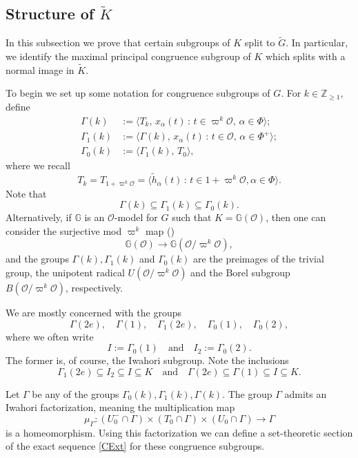 \documentclass[10pt, letterpaper]{amsart}
\theoremstyle{plain}
\theoremstyle{definition}
\numberwithin{equation}{section}
\newcommand{\htt}{\tilde{h}}
\newcommand{\xa}{x_{\alpha}}
\newcommand{\Gt}{\widetilde{G}}
\newcommand{\Kt}{\widetilde{K}}
\newcommand{\Ocal}{\mathcal{O}}
\newcommand{\la}{\langle}
\newcommand{\ra}{\rangle}
\newcommand{\st}{\,:\,}
\newcommand{\qand}{{\quad\text{and}\quad}}
\begin{document}

\subsection{Structure of $\Kt$}\label{SSecSplittings}

In this subsection we prove that certain subgroups of $K$ split to $\Gt$. In particular, we identify the maximal principal congruence subgroup of $K$ which splits with a normal image in $\Kt$.

To begin we set up some notation for congruence subgroups of $G$. For $k\in\mathbb{Z}_{\geq1}$, define
\begin{align*}
\Gamma(k)&:=\la T_{k},\, \xa(t)\st t\in\varpi^k\Ocal,\, \alpha\in\Phi\ra;\\
\Gamma_1(k)&:=\la\Gamma(k),\, \xa(t)\st t\in\Ocal,\, \alpha\in\Phi^+\ra;\\
\Gamma_0(k)&:=\la \Gamma_1(k),\, T_{0}\ra,
\end{align*}
where we recall
\[
T_k=T_{1+\varpi^k\Ocal}=\la\htt_{\alpha}(t)\st t\in 1+\varpi^k\Ocal, \alpha\in\Phi\ra.
\]
Note that 
\[
\Gamma(k)\subseteq\Gamma_1(k)\subseteq\Gamma_0(k).
\] 
Alternatively, if $\mathbb{G}$ is an $\Ocal$-model for $G$ such that $K=\mathbb{G}(\Ocal)$, then one can consider the surjective mod $\varpi^k$ map (\cite[Proposition 1.6]{A69})
\[
\mathbb{G}(\Ocal)\longrightarrow \mathbb{G}(\Ocal\slash\varpi^k\Ocal),
\]
and the groups $\Gamma(k), \Gamma_1(k)$ and $\Gamma_0(k)$ are the preimages of the trivial group, the unipotent radical $U(\Ocal\slash\varpi^k\Ocal)$ and the Borel subgroup $B(\Ocal\slash\varpi^k\Ocal)$, respectively. 


We are mostly concerned with the groups
\[
\Gamma(2e),\quad \Gamma(1), \quad \Gamma_1(2e),\quad   \Gamma_0(1),\quad\Gamma_0(2),
\]
where we often write
\begin{equation}\label{E:I_and_I_2_def}
    I:=\Gamma_0(1)\qand I_2:=\Gamma_0(2).
\end{equation}
The former is, of course, the Iwahori subgroup. Note the inclusions
\[
\Gamma_1(2e)\subseteq I_2\subseteq I\subseteq K
\qand \Gamma(2e)\subseteq\Gamma(1)\subseteq I\subseteq K.
\]

Let $\Gamma$ be any of the groups $\Gamma_{0}(k),\Gamma_{1}(k),\Gamma(k)$. The group $\Gamma$ admits an Iwahori factorization, meaning the multiplication map 
\begin{equation*}
	\mu_{\Gamma}: (U^{-}_{0}\cap \Gamma)\times (T_{0}\cap \Gamma)\times (U_{0}\cap \Gamma)\rightarrow \Gamma
\end{equation*}
is a homeomorphism. Using this factorization we can define a set-theoretic section of the exact sequence \eqref{CExt} for these congruence subgroups.
\end{document}

